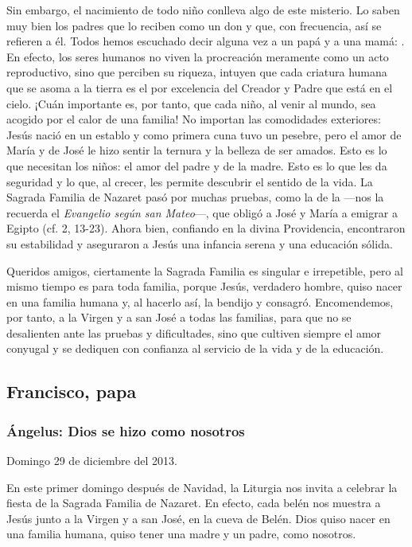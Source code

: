 Sin embargo, el nacimiento de todo niño conlleva algo de este misterio. Lo saben muy bien los padres que lo reciben como un don y que, con frecuencia, así se refieren a él. Todos hemos escuchado decir alguna vez a un papá y a una mamá: . En efecto, los seres humanos no viven la procreación meramente como un acto reproductivo, sino que perciben su riqueza, intuyen que cada criatura humana que se asoma a la tierra es el  por excelencia del Creador y Padre que está en el cielo. ¡Cuán importante es, por tanto, que cada niño, al venir al mundo, sea acogido por el calor de una familia! No importan las comodidades exteriores: Jesús nació en un establo y como primera cuna tuvo un pesebre, pero el amor de María y de José le hizo sentir la ternura y la belleza de ser amados. Esto es lo que necesitan los niños: el amor del padre y de la madre. Esto es lo que les da seguridad y lo que, al crecer, les permite descubrir el sentido de la vida. La Sagrada Familia de Nazaret pasó por muchas pruebas, como la de la  ---nos la recuerda el \emph{Evangelio según san Mateo}---, que obligó a José y María a emigrar a Egipto (cf. 2, 13-23). Ahora bien, confiando en la divina Providencia, encontraron su estabilidad y aseguraron a Jesús una infancia serena y una educación sólida.

Queridos amigos, ciertamente la Sagrada Familia es singular e irrepetible, pero al mismo tiempo es  para toda familia, porque Jesús, verdadero hombre, quiso nacer en una familia humana y, al hacerlo así, la bendijo y consagró. Encomendemos, por tanto, a la Virgen y a san José a todas las familias, para que no se desalienten ante las pruebas y dificultades, sino que cultiven siempre el amor conyugal y se dediquen con confianza al servicio de la vida y de la educación.

\subsection{Francisco, papa}

\subsubsection{Ángelus: Dios se hizo como nosotros}

Domingo 29 de diciembre del 2013.

En este primer domingo después de Navidad, la Liturgia nos invita a celebrar la fiesta de la Sagrada Familia de Nazaret. En efecto, cada belén nos muestra a Jesús junto a la Virgen y a san José, en la cueva de Belén. Dios quiso nacer en una familia humana, quiso tener una madre y un padre, como nosotros.

